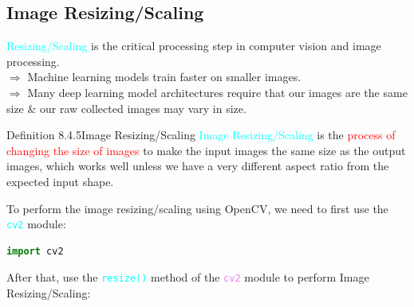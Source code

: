 \documentclass{book}
\begin{document}
\subsection{Image Resizing/Scaling}
\textcolor{cyan}{Resizing/Scaling} is the critical processing step in computer vision and image processing.\\
$\Rightarrow$ Machine learning models train faster on smaller images.\\
$\Rightarrow$ Many deep learning model architectures require that our images are the same size \& our raw collected images may vary in size.\\
\newpage
\begin{defBox}{Definition 8.4.5}{Image Resizing/Scaling}
    \textcolor{cyan}{Image Resizing/Scaling} is the \textcolor{red}{process of changing the size of images} to make the input images the same size as the output images, which works well unless we have a very different aspect ratio from the expected input shape.
\end{defBox}
To perform the image resizing/scaling using OpenCV, we need to first use the \textcolor{cyan}{\texttt{cv2}} module:
\begin{lstlisting}[language=Python, basicstyle=\ttfamily\small, keywordstyle=\color{blue}, commentstyle=\color{forestgreen}, stringstyle=\color{red}, showstringspaces=false]
                                            import cv2
\end{lstlisting}
After that, use the \textcolor{cyan}{\texttt{resize()}} method of the \textcolor{violet}{\texttt{cv2}} module to perform Image Resizing/Scaling:
\end{document}

